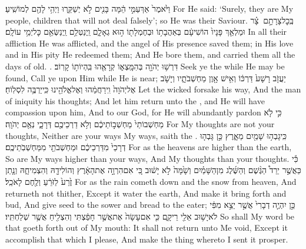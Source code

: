 {וַיֹּ֙אמֶר֙ אַךְ\maqqaf עַמִּ֣י הֵ֔מָּה בָּנִ֖ים לֹ֣א יְשַׁקֵּ֑רוּ וַיְהִ֥י לָהֶ֖ם לְמוֹשִֽׁיעַ׃}
{For He said: ‘Surely, they are My people, children that will not deal falsely’; so He was their Saviour.}
{בְּֽכׇל\maqqaf צָרָתָ֣ם \legarmeh  {} צָ֗ר וּמַלְאַ֤ךְ פָּנָיו֙ הוֹשִׁיעָ֔ם בְּאַהֲבָת֥וֹ וּבְחֶמְלָת֖וֹ ה֣וּא גְאָלָ֑ם וַֽיְנַטְּלֵ֥ם וַֽיְנַשְּׂאֵ֖ם כׇּל\maqqaf יְמֵ֥י עוֹלָֽם׃}
{In all their affliction He was afflicted, and the angel of His presence saved them; in His love and in His pity He redeemed them; And He bore them, and carried them all the days of old. .}
\newperek
{}
\label{haft_52}
\setcounter{chap}{55}
\setcounter{verse}{6}
{דִּרְשׁ֥וּ יְהֹוָ֖ה בְּהִמָּֽצְא֑וֹ קְרָאֻ֖הוּ בִּֽהְיוֹת֥וֹ קָרֽוֹב׃}
{Seek ye the \lord\space while He may be found, Call ye upon Him while He is near;}
{יַעֲזֹ֤ב רָשָׁע֙ דַּרְכּ֔וֹ וְאִ֥ישׁ אָ֖וֶן מַחְשְׁבֹתָ֑יו וְיָשֹׁ֤ב אֶל\maqqaf יְהֹוָה֙ וִֽירַחֲמֵ֔הוּ וְאֶל\maqqaf אֱלֹהֵ֖ינוּ כִּֽי\maqqaf יַרְבֶּ֥ה לִסְלֽוֹחַ׃}
{Let the wicked forsake his way, And the man of iniquity his thoughts; And let him return unto the \lord, and He will have compassion upon him, And to our God, for He will abundantly pardon}
{כִּ֣י לֹ֤א מַחְשְׁבוֹתַי֙ מַחְשְׁב֣וֹתֵיכֶ֔ם וְלֹ֥א דַרְכֵיכֶ֖ם דְּרָכָ֑י נְאֻ֖ם יְהֹוָֽה׃}
{For My thoughts are not your thoughts, Neither are your ways My ways, saith the \lord.}
{כִּֽי\maqqaf גָבְה֥וּ שָׁמַ֖יִם מֵאָ֑רֶץ כֵּ֣ן גָּבְה֤וּ דְרָכַי֙ מִדַּרְכֵיכֶ֔ם וּמַחְשְׁבֹתַ֖י מִמַּחְשְׁבֹֽתֵיכֶֽם׃}
{For as the heavens are higher than the earth, So are My ways higher than your ways, And My thoughts than your thoughts.}
{כִּ֡י כַּאֲשֶׁ֣ר יֵרֵד֩ הַגֶּ֨שֶׁם וְהַשֶּׁ֜לֶג מִן\maqqaf הַשָּׁמַ֗יִם וְשָׁ֙מָּה֙ לֹ֣א יָשׁ֔וּב כִּ֚י אִם\maqqaf הִרְוָ֣ה אֶת\maqqaf הָאָ֔רֶץ וְהוֹלִידָ֖הּ וְהִצְמִיחָ֑הּ וְנָ֤תַן זֶ֙רַע֙ לַזֹּרֵ֔עַ וְלֶ֖חֶם לָאֹכֵֽל׃}
{For as the rain cometh down and the snow from heaven, And returneth not thither, Except it water the earth, And make it bring forth and bud, And give seed to the sower and bread to the eater;}
{כֵּ֣ן יִהְיֶ֤ה דְבָרִי֙ אֲשֶׁ֣ר יֵצֵ֣א מִפִּ֔י לֹא\maqqaf יָשׁ֥וּב אֵלַ֖י רֵיקָ֑ם כִּ֤י אִם\maqqaf עָשָׂה֙ אֶת\maqqaf אֲשֶׁ֣ר חָפַ֔צְתִּי וְהִצְלִ֖יחַ אֲשֶׁ֥ר שְׁלַחְתִּֽיו׃}
{So shall My word be that goeth forth out of My mouth: It shall not return unto Me void, Except it accomplish that which I please, And make the thing whereto I sent it prosper.}
